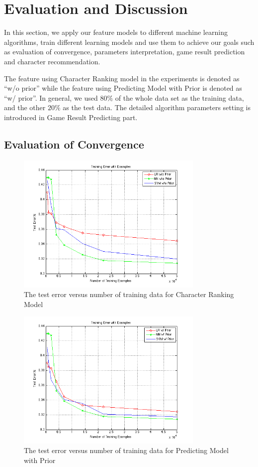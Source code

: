 \documentclass{article} %
\begin{document}
\section{Evaluation and Discussion}

In this section, we apply our feature models to different machine learning algorithms, train different learning models and use them to achieve our goals such as evaluation of convergence, parameters interpretation, game result prediction and character recommendation.

The feature using Character Ranking model in the experiments is denoted as ``w/o prior'' while the feature using Predicting Model with Prior is denoted as ``w/ prior''. In general, we used $80\%$ of the whole data set as the training data, and the other $20\%$ as the test data. The detailed algorithm parameters setting is introduced in Game Result Predicting part.

\subsection{Evaluation of Convergence}


\begin{figure}[t]
  \centering
    \includegraphics[width=90mm]{resWOprior.png}
  \caption{The test error versus number of training data for Character Ranking Model}
  \label{fig:2}
\end{figure}


\begin{figure}[t]
  \centering
    \includegraphics[width=90mm]{withPrior.png}
  \caption{The test error versus number of training data for Predicting Model with Prior}
  \label{fig:3}
\end{figure}
\end{document}
